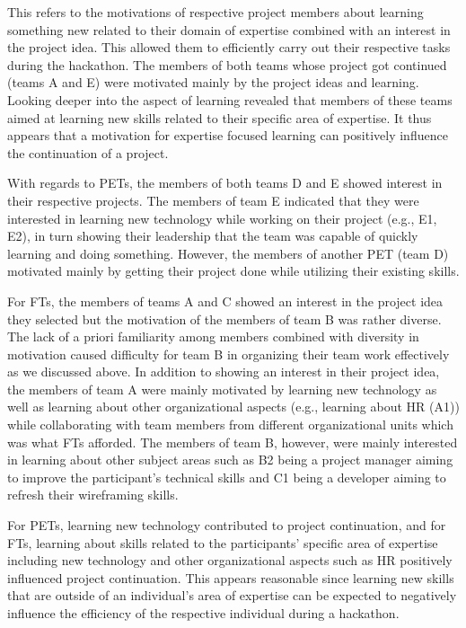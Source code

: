 \documentclass{hcij}
\begin{document}
This refers to the motivations of respective project members about learning something new related to their domain of expertise combined with an interest in the project idea. This allowed them to efficiently carry out their respective tasks during the hackathon. The members of both teams whose project got continued (teams A and E) were motivated mainly by the project ideas and learning. Looking deeper into the aspect of learning revealed that members of these teams aimed at learning new skills related to their specific area of expertise. It thus appears that a motivation for expertise focused learning can positively influence the continuation of a project.

With regards to PETs, the members of both teams D and E showed interest in their respective projects. The members of team E indicated that they were interested in learning new technology while working on their project (e.g., E1, E2), in turn showing their leadership that the team was capable of quickly learning and doing something. However, the members of another PET (team D) motivated mainly by getting their project done while utilizing their existing skills.

For FTs, the members of teams A and C showed an interest in the project idea they selected but the motivation of the members of team B was rather diverse. The lack of a priori familiarity among members combined with diversity in motivation caused difficulty for team B in organizing their team work effectively as we discussed above. In addition to showing an interest in their project idea, the members of team A were mainly motivated by learning new technology as well as learning about other organizational aspects (e.g., learning about HR (A1)) while collaborating with team members from different organizational units which was what FTs afforded. The members of team B, however, were mainly interested in learning about other subject areas such as B2 being a project manager aiming to improve the participant’s technical skills and C1 being a developer aiming to refresh their wireframing skills.

For PETs, learning new technology contributed to project continuation, and for FTs, learning about skills related to the participants’ specific area of expertise including new technology and other organizational aspects such as HR positively influenced project continuation. This appears reasonable since learning new skills that are outside of an individual’s area of expertise can be expected to negatively influence the efficiency of the respective individual during a hackathon.
\end{document}
